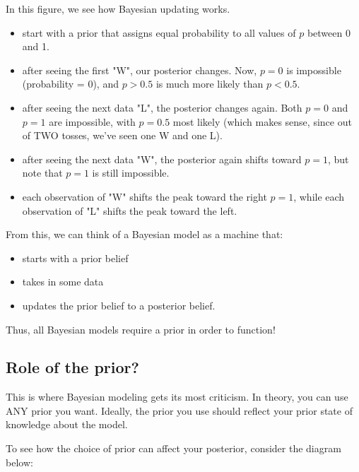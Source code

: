 \documentclass[11pt]{article}
\begin{document}
In this figure, we see how Bayesian updating works.  
\begin{itemize}
\item start with a prior that assigns equal probability to all values of $p$ between 0 and 1.
\item after seeing the first "W", our posterior changes.  Now, $p=0$ is impossible (probability = 0), and $p>0.5$ is much more likely than $p<0.5$.
\item after seeing the next data "L", the posterior changes again.  Both $p=0$ and $p=1$ are impossible, with $p=0.5$ most likely (which makes sense, since out of TWO tosses, we've seen one W and one L).
\item after seeing the next data "W", the posterior again shifts toward $p=1$, but note that $p=1$ is still impossible.
\item each observation of "W" shifts the peak toward the right $p=1$, while each observation of "L" shifts the peak toward the left.
\end{itemize}

From this, we can think of a Bayesian model as a machine that:
\begin{itemize}
\item starts with a prior belief
\item takes in some data
\item updates the prior belief to a posterior belief.
\end{itemize}

Thus, all Bayesian models require a prior in order to function!  

\subsection*{Role of the prior?}
\label{sec-1-3}
This is where Bayesian modeling gets its most criticism.  In theory, you can use ANY prior you want.  Ideally, the prior you use should reflect your prior state of knowledge about the model.  

To see how the choice of prior can affect your posterior, consider the diagram below:
\end{document}
